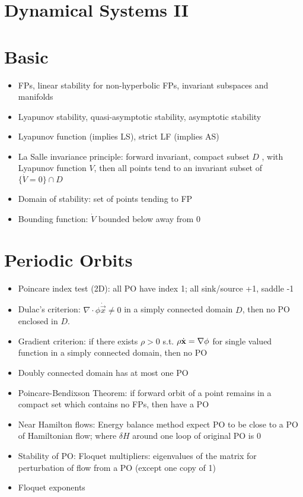 


\section*{Dynamical Systems \hfill II}

\section{Basic}
\begin{itemize}
\item FPs, linear stability for non-hyperbolic FPs, invariant subspaces and manifolds
\end{itemize}
\begin{itemize}
    \item Lyapunov stability, quasi-asymptotic stability, asymptotic stability
    \item Lyapunov function (implies LS), strict LF (implies AS)
    \item La Salle invariance principle: forward invariant, compact subset $D$ , with Lyapunov function $V$, then all points tend to an invariant subset of $\{\dot{V} = 0\} \cap D$
    \item Domain of stability: set of points tending to FP
    \item Bounding function: $\dot{V}$ bounded below away from 0
\end{itemize}

\section{Periodic Orbits}
\begin{itemize}
    \item Poincare index test (2D): all PO have index 1; all sink/source +1, saddle -1
    \item Dulac's criterion: $\nabla \cdot {\phi \dot{\vec{x}}} \neq 0$ in a simply connected domain $D$, then no PO enclosed in $D$. 
    \item Gradient criterion: if there exists $\rho > 0$ s.t. $\rho \dot{\boldsymbol{\mathbf{x}}} = \mathbf{\nabla} \phi$ for single valued function in a simply connected domain, then no PO
    \item Doubly connected domain has at most one PO
    \item Poincare-Bendixson Theorem: if forward orbit of a point remains in a compact set which contains no FPs, then have a PO
    \item Near Hamilton flows: Energy balance method expect PO to be close to a PO of Hamiltonian flow; where $\delta H$ around one loop of original PO is 0
    \item Stability of PO: Floquet multipliers: eigenvalues of the matrix for perturbation of flow from a PO (except one copy of 1)
    \item Floquet exponents
\end{itemize}
